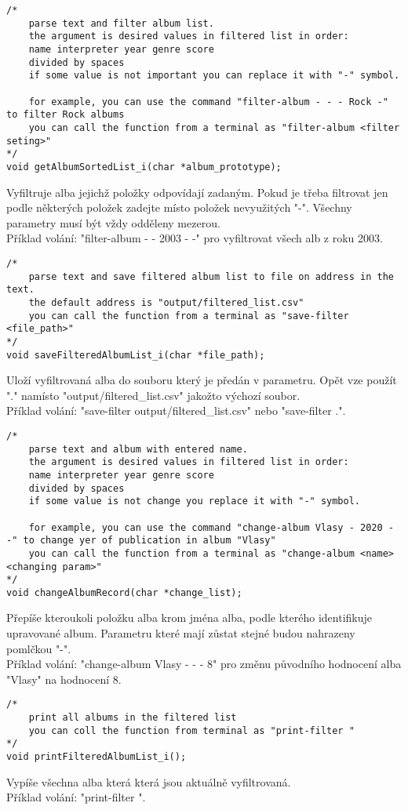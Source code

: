\begin{lstlisting}[style=CStyle]
/*
    parse text and filter album list.
    the argument is desired values in filtered list in order:
    name interpreter year genre score
    divided by spaces
    if some value is not important you can replace it with "-" symbol.

    for example, you can use the command "filter-album - - - Rock -" to filter Rock albums
    you can call the function from a terminal as "filter-album <filter seting>"
*/
void getAlbumSortedList_i(char *album_prototype);
\end{lstlisting}
Vyfiltruje alba jejichž položky odpovídají zadaným.
Pokud je třeba filtrovat jen podle některých položek zadejte místo položek nevyužitých "-".
Všechny parametry musí být vždy odděleny mezerou.\\ 
Příklad volání: "filter-album - - 2003 - -" pro vyfiltrovat všech alb z roku 2003.

\begin{lstlisting}[style=CStyle]
/*
    parse text and save filtered album list to file on address in the text.
    the default address is "output/filtered_list.csv"
    you can call the function from a terminal as "save-filter <file_path>"
*/
void saveFilteredAlbumList_i(char *file_path);
\end{lstlisting}
Uloží vyfiltrovaná alba do souboru který je předán v parametru.
Opět vze použít "." namísto "output/filtered\_list.csv" jakožto výchozí soubor.\\ 
Příklad volání: "save-filter output/filtered\_list.csv" nebo "save-filter .".
\newpage
\begin{lstlisting}[style=CStyle]
/*
    parse text and album with entered name.
    the argument is desired values in filtered list in order:
    name interpreter year genre score
    divided by spaces
    if some value is not change you replace it with "-" symbol.
    
    for example, you can use the command "change-album Vlasy - 2020 - -" to change yer of publication in album "Vlasy"
    you can call the function from a terminal as "change-album <name> <changing param>"
*/
void changeAlbumRecord(char *change_list);
\end{lstlisting}
Přepíše kteroukoli položku alba krom jména alba, podle kterého identifikuje upravované album.
Parametru které mají zůstat stejné budou nahrazeny pomlčkou "-".\\ 
Příklad volání: "change-album Vlasy - - - 8" pro změnu původního hodnocení alba "Vlasy" na hodnocení 8. 

\begin{lstlisting}[style=CStyle]
/*
    print all albums in the filtered list
    you can coll the function from terminal as "print-filter "
*/
void printFilteredAlbumList_i();
\end{lstlisting}
Vypíše všechna alba která která jsou aktuálně vyfiltrovaná.\\ 
Příklad volání: "print-filter ". 